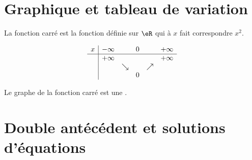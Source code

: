 
\section{Graphique et tableau de variation}

La fonction carré est la fonction définie sur \( \eR\) qui à \( x\) fait correspondre \( x^2\).

\begin{multicols}{2}

        \begin{equation*}
            \begin{array}[]{c|ccccc}
                x&-\infty&&0&&+\infty\\
                \hline
                &+\infty&&&&+\infty\\
                &&\searrow&&\nearrow&\\
                &&&0&&
            \end{array}
        \end{equation*}

        \columnbreak

        \begin{center}

        \end{center}
\end{multicols}

\begin{definition}
    Le graphe de la fonction carré est une .
\end{definition}
\section{Double antécédent et solutions d'équations}

